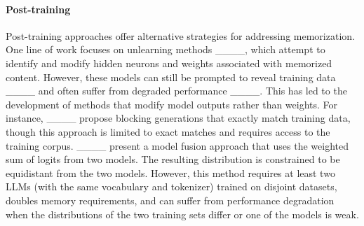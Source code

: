 \paragraph{Post-training}
Post-training approaches offer alternative strategies for addressing memorization. One line of work focuses on unlearning methods ____, which attempt to identify and modify hidden neurons and weights associated with memorized content. However, these models can still be prompted to reveal training data ____ and often suffer from degraded performance ____. This has led to the development of methods that modify model outputs rather than weights. For instance, ____ propose blocking generations that exactly match training data, though this approach is limited to exact matches and requires access to the training corpus. ____ present a model fusion approach that uses the weighted sum of logits from two models. The resulting distribution is constrained to be equidistant from the two models. However, this method requires at least two LLMs (with the same vocabulary and tokenizer) trained on disjoint datasets, doubles memory requirements, and can suffer from performance degradation when the distributions of the two training sets differ or one of the models is weak.